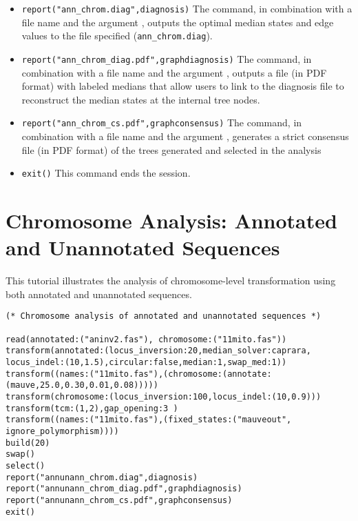 \begin{itemize}
\item \texttt{report("ann\_chrom.diag",diagnosis)}  The  command, in combination with a file name and 
the argument , outputs the optimal median states and edge values to the file specified 
(\texttt{ann\_chrom.diag}). 
\item \texttt{report("ann\_chrom\_diag.pdf",graphdiagnosis)}  The  command, in combination 
with a file name and the argument  , outputs a file (in PDF format) with labeled 
medians that allow users to link to the diagnosis file to reconstruct the median states at the internal tree nodes.
 \item \texttt{report("ann\_chrom\_cs.pdf",graphconsensus)}  The  command, in combination with a file 
name and the argument , generates a strict consensus file (in PDF format) of the trees generated 
and selected in the analysis 
\item \texttt{exit()} This command ends the \poy session.
\end{itemize}


\section{Chromosome Analysis: Annotated and Unannotated Sequences}{\label{tutorial10}}
This tutorial illustrates the analysis of chromosome-level transformation using both annotated and unannotated sequences.


\begin{verbatim}
(* Chromosome analysis of annotated and unannotated sequences *)

read(annotated:("aninv2.fas"), chromosome:("11mito.fas"))
transform(annotated:(locus_inversion:20,median_solver:caprara,
locus_indel:(10,1.5),circular:false,median:1,swap_med:1))
transform((names:("11mito.fas"),(chromosome:(annotate:
(mauve,25.0,0.30,0.01,0.08)))))
transform(chromosome:(locus_inversion:100,locus_indel:(10,0.9)))
transform(tcm:(1,2),gap_opening:3 )
transform((names:("11mito.fas"),(fixed_states:("mauveout",
ignore_polymorphism))))
build(20)
swap()
select()
report("annunann_chrom.diag",diagnosis)
report("annunann_chrom_diag.pdf",graphdiagnosis)
report("annunann_chrom_cs.pdf",graphconsensus)
exit()
\end{verbatim}

